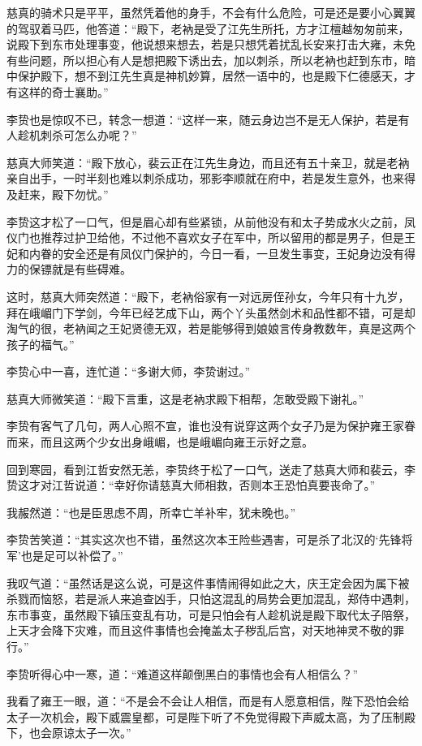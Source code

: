 慈真的骑术只是平平，虽然凭着他的身手，不会有什么危险，可是还是要小心翼翼的驾驭着马匹，他答道：“殿下，老衲是受了江先生所托，方才江檀越匆匆前来，说殿下到东市处理事变，他说想来想去，若是只想凭着扰乱长安来打击大雍，未免有些问题，所以担心有人是想把殿下诱出去，加以刺杀，所以老衲也赶到东市，暗中保护殿下，想不到江先生真是神机妙算，居然一语中的，也是殿下仁德感天，才有这样的奇士襄助。”

李贽也是惊叹不已，转念一想道：“这样一来，随云身边岂不是无人保护，若是有人趁机刺杀可怎么办呢？”

慈真大师笑道：“殿下放心，裴云正在江先生身边，而且还有五十亲卫，就是老衲亲自出手，一时半刻也难以刺杀成功，邪影李顺就在府中，若是发生意外，也来得及赶来，殿下勿忧。”

李贽这才松了一口气，但是眉心却有些紧锁，从前他没有和太子势成水火之前，凤仪门也推荐过护卫给他，不过他不喜欢女子在军中，所以留用的都是男子，但是王妃和内眷的安全还是有凤仪门保护的，今日一看，一旦发生事变，王妃身边没有得力的保镖就是有些碍难。

这时，慈真大师突然道：“殿下，老衲俗家有一对远房侄孙女，今年只有十九岁，拜在峨嵋门下学剑，今年已经艺成下山，两个丫头虽然剑术和品性都不错，可是却淘气的很，老衲闻之王妃贤德无双，若是能够得到娘娘言传身教数年，真是这两个孩子的福气。”

李贽心中一喜，连忙道：“多谢大师，李贽谢过。”

慈真大师微笑道：“殿下言重，这是老衲求殿下相帮，怎敢受殿下谢礼。”

李贽有客气了几句，两人心照不宣，谁也没有说穿这两个女子乃是为保护雍王家眷而来，而且这两个少女出身峨嵋，也是峨嵋向雍王示好之意。

回到寒园，看到江哲安然无恙，李贽终于松了一口气，送走了慈真大师和裴云，李贽这才对江哲说道：“幸好你请慈真大师相救，否则本王恐怕真要丧命了。”

我赧然道：“也是臣思虑不周，所幸亡羊补牢，犹未晚也。”

李贽苦笑道：“其实这次也不错，虽然这次本王险些遇害，可是杀了北汉的‘先锋将军’也是足可以补偿了。”

我叹气道：“虽然话是这么说，可是这件事情闹得如此之大，庆王定会因为属下被杀戮而恼怒，若是派人来追查凶手，只怕这混乱的局势会更加混乱，郑侍中遇刺，东市事变，虽然殿下镇压变乱有功，可是只怕会有人趁机说是殿下取代太子陪祭，上天才会降下灾难，而且这件事情也会掩盖太子秽乱后宫，对天地神灵不敬的罪行。”

李贽听得心中一寒，道：“难道这样颠倒黑白的事情也会有人相信么？”

我看了雍王一眼，道：“不是会不会让人相信，而是有人愿意相信，陛下恐怕会给太子一次机会，殿下威震皇都，可是陛下听了不免觉得殿下声威太高，为了压制殿下，也会原谅太子一次。”

